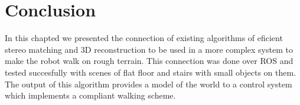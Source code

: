 
\section{Conclusion}

In this chapted we presented the connection of existing algorithms of eficient stereo matching and 3D reconstruction to be used in a more complex system to make the robot walk on rough terrain. This connection was done over ROS and tested succesfully with scenes of flat floor and stairs with small objects on them. The output of this algorithm provides a model of the world to a control system which implements a compliant walking scheme.